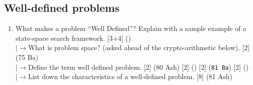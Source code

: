 \documentclass[12pt]{article}
\newcommand{\lb}{\\$\left|\rightarrow\right.$}
\begin{document}
  \subsection{Well-defined problems}
    \begin{enumerate}[topsep=0pt, noitemsep]
      \item What makes a problem ``Well Defined''? Explain with a sample example of a state-space search framework. \hfill [3+4] ()
        \lb What is problem space? (asked ahead of the crypto-arithmetic below). \hfill [2] (75 Ba)
        \lb Define the term well defined problem. \hfill [2] (80 Ash) [2] () [2] (\texttt{81 Ba}) [2] ()
        \lb List down the characteristics of a well-defined problem. \hfill [8] (81 Ash)
    \end{enumerate}
\end{document}
